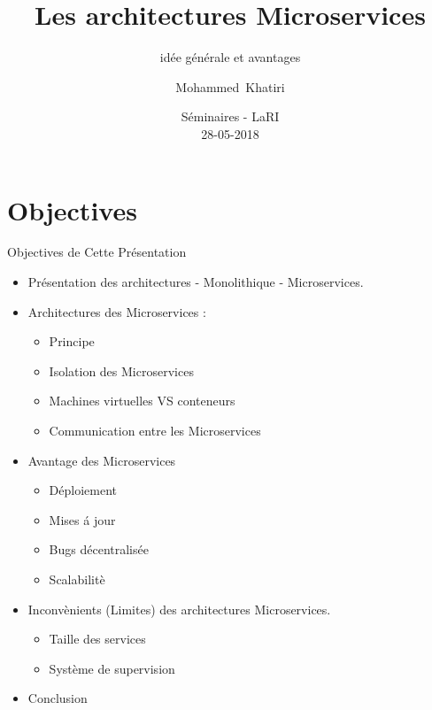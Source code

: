 \documentclass{beamer}
\title{Les architectures Microservices}
\subtitle{id\'ee g\'en\'erale et avantages}
\author{Mohammed~Khatiri\inst{2}\inst{1}}
\institute[Univ. Grenoble Alpes, CNRS, Inria, LIG] %
{
    \inst{1}%
  University Mohammed First\\
  Faculty of Sciences, LaRI, Morocco\\
  \textcolor{red}{Professeur El Mostafa DAOUDI}
  \and
  \inst{2}%
  Univ. Grenoble Alpes\\
  CNRS, Inria, LIG, France \\
  \textcolor{red}{Professeur Denis trystram}}
\date{Séminaires - LaRI \\ 28-05-2018 }
\begin{document}
\begin{frame}
    \titlepage
\end{frame}



\section{Objectives}

\begin{frame}{Objectives de Cette Pr\'esentation}
    \begin{itemize}[<+->]
        \item {
                Pr\'esentation des architectures - Monolithique - Microservices.              
            }\\ 
        \item 
                Architectures des Microservices : 
            \begin{itemize}
                \item Principe
                \item Isolation des Microservices
                \item Machines virtuelles VS conteneurs
                \item Communication entre les Microservices
            \end{itemize}
                      
        \item Avantage des Microservices
            \begin{itemize}
                \item D\'eploiement
                \item Mises \'a jour
                \item Bugs d\'ecentralis\'ee 
                \item Scalabilit\`e
            \end{itemize}

        \item Inconv\`enients (Limites) des architectures Microservices.
            \begin{itemize}
                \item Taille des services 
                \item Système de supervision
            \end{itemize}

        \item {
            Conclusion
            }

    \end{itemize}
\end{frame}
\end{document}
